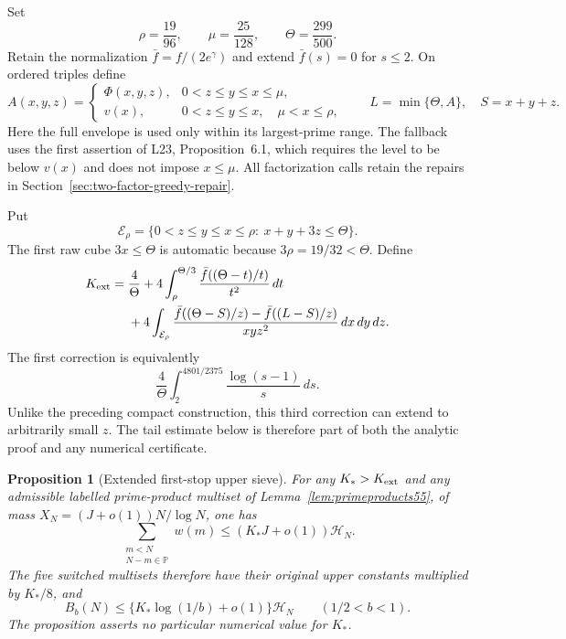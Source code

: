 \documentclass[11pt]{article}
\newtheorem{proposition}[theorem]{Proposition}
\newcommand{\PP}{\mathbb P}
\newcommand{\HN}{\mathcal H_N}
\begin{document}
Set
\[
 \rho=\frac{19}{96},\qquad \mu=\frac{25}{128},\qquad
 \Theta=\frac{299}{500}.
\]
Retain the normalization $\bar f=f/(2e^\gamma)$ and extend
$\bar f(s)=0$ for $s\le2$. On ordered triples define
\[
 A(x,y,z)=
 \begin{cases}
 \Phi(x,y,z),&0<z\le y\le x\le\mu,\\
 v(x),&0<z\le y\le x,\quad\mu<x\le\rho,
 \end{cases}
 \qquad L=\min\{\Theta,A\},\quad S=x+y+z.
\]
Here the full envelope is used only within its largest-prime
range. The fallback uses the first assertion of L23,
Proposition~6.1, which requires the level to be below $v(x)$
and does not impose $x\le\mu$. All factorization calls retain
the repairs in Section~\ref{sec:two-factor-greedy-repair}.

Put
\[
 \mathcal E_\rho=\{0<z\le y\le x\le\rho:\ x+y+3z\le\Theta\}.
\]
The first raw cube $3x\le\Theta$ is automatic because
$3\rho=19/32<\Theta$. Define
\begin{align}
 K_{\rm ext}={}&\frac4\Theta+
 4\int_\rho^{\Theta/3}
          \frac{\bar f((\Theta-t)/t)}{t^2}\,dt\notag\\
 &+4\int_{\mathcal E_\rho}
 \frac{\bar f((\Theta-S)/z)-\bar f((L-S)/z)}{xyz^2}
                  \,dx\,dy\,dz.
 \label{eq:extended-prefix-functional}
\end{align}
The first correction is equivalently
\[
 \frac4\Theta\int_2^{4801/2375}\frac{\log(s-1)}s\,ds.
\]
Unlike the preceding compact construction, this third correction
can extend to arbitrarily small $z$. The tail estimate below is
therefore part of both the analytic proof and any numerical certificate.

\begin{proposition}[Extended first-stop upper sieve]
\label{prop:extended-prefix-upper}
For any $K_*>K_{\rm ext}$ and any admissible labelled prime-product
multiset of Lemma~\ref{lem:primeproducts55}, of mass
$X_N=(J+o(1))N/\log N$, one has
\[
 \sum_{\substack{m<N\\N-m\in\PP}}w(m)
              \le(K_*J+o(1))\HN.
\]
The five switched multisets therefore have their original upper
constants multiplied by $K_*/8$, and
\[
 B_b(N)\le\{K_*\log(1/b)+o(1)\}\HN\qquad(1/2<b<1).
\]
The proposition asserts no particular numerical value for $K_*$.
\end{proposition}
\end{document}
